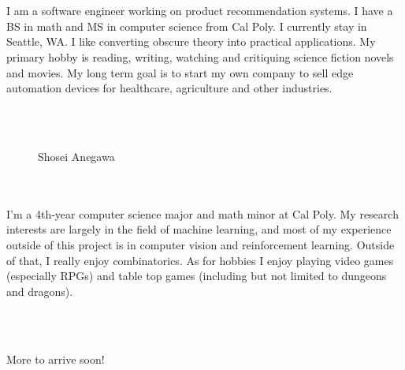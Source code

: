 \documentclass{article}
\begin{document}
\hfill \\

\hfill \\

I am a software engineer working on product recommendation systems. I have a BS in math and MS in computer science from Cal Poly. I currently stay in Seattle, WA. I like converting obscure theory into practical applications. My primary hobby is reading, writing, watching and critiquing science fiction novels and movies. My long term goal is to start my own company to sell edge automation devices for healthcare, agriculture and other industries.

\hfill \\

\hfill \\

\begin{figure}
    \centering
    \vspace{-2mm}\Large{Shosei Anegawa}\vspace{5mm}
    {%
	   \setlength{\fboxsep}{0pt}%
	   \setlength{\fboxrule}{3pt}%
	 }%
\end{figure} \hfill

\hfill \\

\hfill \\

I'm a 4th-year computer science major and math minor at Cal Poly. My research interests are largely in the field of machine learning, and most of my experience outside of this project is in computer vision and reinforcement learning. Outside of that, I really enjoy combinatorics. As for hobbies I enjoy playing video games (especially RPGs) and table top games (including but not limited to dungeons and dragons).

\hfill \\

\hfill \\

\vspace{5cm}
\begin{center}
{\Large{More to arrive soon!}}
\end{center}
\end{document}
